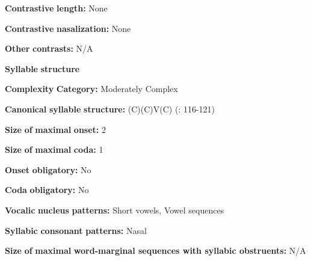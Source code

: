\documentclass[output=paper]{langsci/langscibook}
\begin{document}
\begin{styleBody}
\textbf{Contrastive} \textbf{length:} None
\end{styleBody}

\begin{styleBody}
\textbf{Contrastive} \textbf{nasalization:} None
\end{styleBody}

\begin{styleBody}
\textbf{Other} \textbf{contrasts:} N/A
\end{styleBody}

\begin{styleBody}
\textbf{Syllable} \textbf{structure}
\end{styleBody}

\begin{styleBody}
\textbf{Complexity} \textbf{Category:} Moderately Complex
\end{styleBody}

\begin{styleBody}
\textbf{Canonical} \textbf{syllable} \textbf{structure:} (C)(C)V(C) (\citealt{SandersSanders1980}: 116-121)
\end{styleBody}

\begin{styleBody}
\textbf{Size} \textbf{of} \textbf{maximal} \textbf{onset:} 2
\end{styleBody}

\begin{styleBody}
\textbf{Size} \textbf{of} \textbf{maximal} \textbf{coda:} 1
\end{styleBody}

\begin{styleBody}
\textbf{Onset} \textbf{obligatory:} No
\end{styleBody}

\begin{styleBody}
\textbf{Coda} \textbf{obligatory:} No
\end{styleBody}

\begin{styleBody}
\textbf{Vocalic} \textbf{nucleus} \textbf{patterns:} Short vowels, Vowel sequences
\end{styleBody}

\begin{styleBody}
\textbf{Syllabic} \textbf{consonant} \textbf{patterns:} Nasal
\end{styleBody}

\begin{styleBody}
\textbf{Size} \textbf{of} \textbf{maximal} \textbf{word{}-marginal sequences with syllabic obstruents:} N/A
\end{styleBody}
\end{document}
